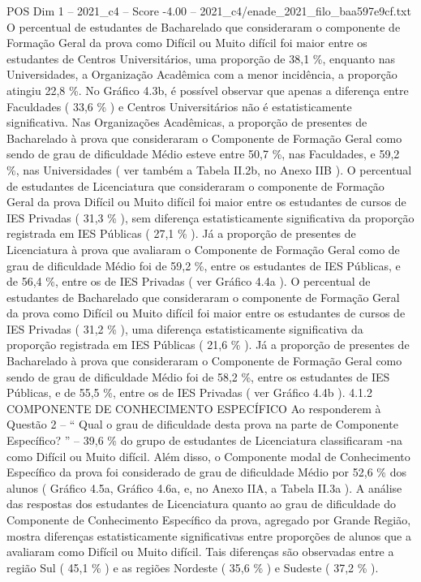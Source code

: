 \begin{textsample}{POS Dim 1 – 2021\_c4 – Score -4.00 – 2021\_c4/enade\_2021\_filo\_baa597e9cf.txt}
O percentual de estudantes de Bacharelado que consideraram o componente de Formação Geral da prova como Difícil ou Muito difícil foi maior entre os estudantes de Centros Universitários, uma proporção de 38,1 \%, enquanto nas Universidades, a Organização Acadêmica com a menor incidência, a proporção atingiu 22,8 \%.
No Gráfico 4.3b, é possível observar que apenas a diferença entre Faculdades ( 33,6 \% ) e Centros Universitários não é estatisticamente significativa.
Nas Organizações Acadêmicas, a proporção de presentes de Bacharelado à prova que consideraram o Componente de Formação Geral como sendo de grau de dificuldade Médio esteve entre 50,7 \%, nas Faculdades, e 59,2 \%, nas Universidades ( ver também a Tabela II.2b, no Anexo IIB ).
O percentual de estudantes de Licenciatura que consideraram o componente de Formação Geral da prova Difícil ou Muito difícil foi maior entre os estudantes de cursos de IES Privadas ( 31,3 \% ), sem diferença estatisticamente significativa da proporção registrada em IES Públicas ( 27,1 \% ).
Já a proporção de presentes de Licenciatura à prova que avaliaram o Componente de Formação Geral como de grau de dificuldade Médio foi de 59,2 \%, entre os estudantes de IES Públicas, e de 56,4 \%, entre os de IES Privadas ( ver Gráfico 4.4a ).
O percentual de estudantes de Bacharelado que consideraram o componente de Formação Geral da prova como Difícil ou Muito difícil foi maior entre os estudantes de cursos de IES Privadas ( 31,2 \% ), uma diferença estatisticamente significativa da proporção registrada em IES Públicas ( 21,6 \% ).
Já a proporção de presentes de Bacharelado à prova que consideraram o Componente de Formação Geral como sendo de grau de dificuldade Médio foi de 58,2 \%, entre os estudantes de IES Públicas, e de 55,5 \%, entre os de IES Privadas ( ver Gráfico 4.4b ). 4.1.2 COMPONENTE DE CONHECIMENTO ESPECÍFICO Ao responderem à Questão 2 – “ Qual o grau de dificuldade desta prova na parte de Componente Específico? ” – 39,6 \% do grupo de estudantes de Licenciatura classificaram -na como Difícil ou Muito difícil.
Além disso, o Componente modal de Conhecimento Específico da prova foi considerado de grau de dificuldade Médio por 52,6 \% dos alunos ( Gráfico 4.5a, Gráfico 4.6a, e, no Anexo IIA, a Tabela II.3a ).
A análise das respostas dos estudantes de Licenciatura quanto ao grau de dificuldade do Componente de Conhecimento Específico da prova, agregado por Grande Região, mostra diferenças estatisticamente significativas entre proporções de alunos que a avaliaram como Difícil ou Muito difícil.
Tais diferenças são observadas entre a região Sul ( 45,1 \% ) e as regiões Nordeste ( 35,6 \% ) e Sudeste ( 37,2 \% ).

\end{textsample}
